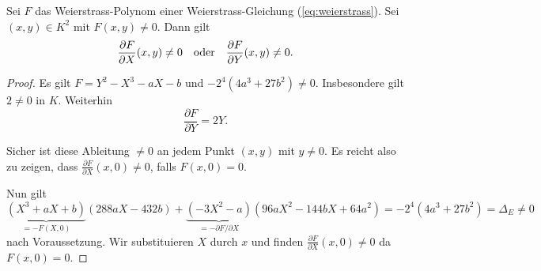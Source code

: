\begin{lemma}
  \label{lem:smooth}
  Sei $F$ das Weierstrass-Polynom einer Weierstrass-Gleichung
  (\ref{eq:weierstrass}). Sei $(x,y)\in K^2$ mit $F(x,y)\not=0$. Dann
  gilt
  \begin{equation*}
    \frac{\partial F}{\partial X}(x,y)\not=0 \quad\text{oder}\quad
    \frac{\partial F}{\partial Y}(x,y)\not=0.
  \end{equation*}
\end{lemma}
\begin{proof}
  Es gilt $F = Y^2 - X^3-aX-b$ und $-2^4(4a^3+27b^2)\not=0$.
  Insbesondere gilt $2\not=0$ in $K$. Weiterhin
  \begin{equation*}
    \frac{\partial F}{\partial Y} = 2Y. 
  \end{equation*}

  Sicher ist diese Ableitung $\not=0$ an jedem Punkt $(x,y)$ mit
  $y\not=0$.
  Es reicht also zu zeigen, dass $    \frac{\partial F}{\partial
    X}(x,0)\not=0$, falls $F(x,0)=0$.

  Nun gilt
  \begin{equation*}
    \underbrace{(X^3+aX+b)}_{=-F(X,0)}(288aX-432b) +
    \underbrace{(-3X^2-a)}_{= -\partial F/\partial X}(96aX^2 - 144bX + 64a^2)
    = -2^4(4a^3+27b^2) =\Delta_E\not= 0
  \end{equation*}
  nach Voraussetzung.
  Wir substituieren $X$ durch $x$ und finden 
  $\frac{\partial F}{\partial
    X}(x,0)\not=0$ da $F(x,0)=0$.  
\end{proof}

